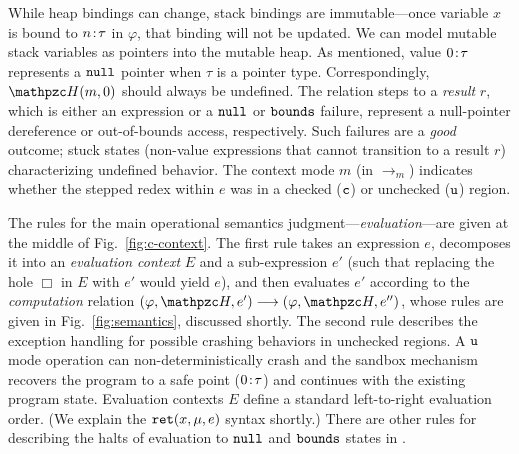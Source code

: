 While heap bindings can change, stack bindings are immutable---once
variable $x$ is bound to ${n}\!:\!{\tau}$ in $\varphi$, that binding will not
be updated. 
We can model mutable stack variables as pointers into the
mutable heap.
As mentioned, value ${0}\!:\!{\tau}$
represents a $\mathtt{null}$ pointer when $\tau$ is a pointer type.
Correspondingly, $\heap(m,0)$ should always be undefined.
The relation steps to a \emph{result} $r$,
which is either an expression or a $\mathtt{null}$ or $\mathtt{bounds}$ failure,
represent a null-pointer dereference or out-of-bounds access,
respectively. Such failures are a \emph{good} outcome; stuck states
(non-value expressions that cannot transition to a result $r$)
characterizing undefined behavior.
%
The context mode $m$ (in $\longrightarrow_{m}$) indicates whether the
stepped redex within $e$ was in a checked ($\texttt{c}$) or
unchecked ($\texttt{u}$) region.

The rules for the main operational semantics
judgment---\emph{evaluation}---are given at the middle of
Fig.~\ref{fig:c-context}.
The first rule takes an expression $e$, decomposes
it into an \emph{evaluation context} $E$ and a sub-expression $e'$
(such that replacing the hole $\Box$ in $E$ with $e'$ would yield
$e$), and then evaluates $e'$ according to the \emph{computation}
  relation $(\varphi,\heap,e') \longrightarrow (\varphi,\heap,e'')$,
whose rules are given in Fig.~\ref{fig:semantics}, discussed
shortly. 
The second rule describes the exception handling 
for possible crashing behaviors in unchecked regions.
A $\texttt{u}$ mode operation can non-deterministically crash
and the \systemname sandbox mechanism recovers
the program to a safe point (${0}\!:\!{\tau}$)
and continues with the existing program state.
Evaluation contexts $E$ define a standard left-to-right evaluation order. (We explain the
$\mathtt{ret}({x},{\mu},{e})$ syntax shortly.)
There are other rules for describing the halts of evaluation to $\mathtt{null}$ and $\mathtt{bounds}$ states in .

